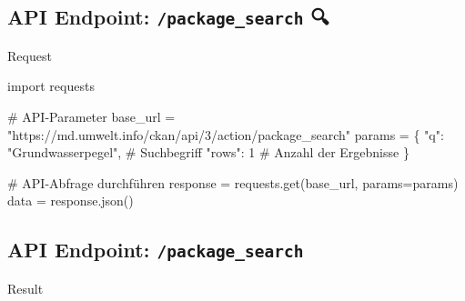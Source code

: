 \documentclass[
  letterpaper,
  DIV=11]{scrartcl}
\newenvironment{Shaded}{\begin{snugshade}}{\end{snugshade}}
\newcommand{\CommentTok}[1]{\textcolor[rgb]{0.37,0.37,0.37}{#1}}
\newcommand{\DecValTok}[1]{\textcolor[rgb]{0.68,0.00,0.00}{#1}}
\newcommand{\ImportTok}[1]{\textcolor[rgb]{0.00,0.46,0.62}{#1}}
\newcommand{\NormalTok}[1]{\textcolor[rgb]{0.00,0.23,0.31}{#1}}
\newcommand{\OperatorTok}[1]{\textcolor[rgb]{0.37,0.37,0.37}{#1}}
\newcommand{\StringTok}[1]{\textcolor[rgb]{0.13,0.47,0.30}{#1}}
\begin{document}
\subsection{\texorpdfstring{API Endpoint:
\textbf{\texttt{/package\_search}}
🔍}{API Endpoint: /package\_search 🔍}}\label{api-endpoint-package_search}

Request

\begin{Shaded}
\begin{Highlighting}[]
\ImportTok{import}\NormalTok{ requests}

\CommentTok{\# API{-}Parameter}
\NormalTok{base\_url }\OperatorTok{=} \StringTok{"https://md.umwelt.info/ckan/api/3/action/package\_search"}
\NormalTok{params }\OperatorTok{=}\NormalTok{ \{}
    \StringTok{"q"}\NormalTok{: }\StringTok{"Grundwasserpegel"}\NormalTok{,  }\CommentTok{\# Suchbegriff}
    \StringTok{"rows"}\NormalTok{: }\DecValTok{1}                 \CommentTok{\# Anzahl der Ergebnisse}
\NormalTok{\}}

\CommentTok{\# API{-}Abfrage durchführen}
\NormalTok{response }\OperatorTok{=}\NormalTok{ requests.get(base\_url, params}\OperatorTok{=}\NormalTok{params)}
\NormalTok{data }\OperatorTok{=}\NormalTok{ response.json()}
\end{Highlighting}
\end{Shaded}

\subsection{\texorpdfstring{API Endpoint:
\textbf{\texttt{/package\_search}}}{API Endpoint: /package\_search}}\label{api-endpoint-package_search-1}

Result
\end{document}
